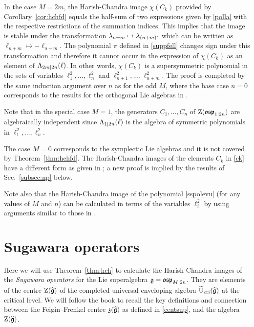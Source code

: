 \documentclass[12pt]{article}
\begin{document}
In the case $M=2m$,
the Harish-Chandra image
$\chi(C_k)$ provided by Corollary~\ref{cor:hchfd} equals
the half-sum of two expressions given by \eqref{polla} with the respective
restrictions of the summation indices. This implies that the image
is stable under the transformation $\lambda_{n+m}\mapsto \lambda_{(n+m)'}$
which can be written as $\ell_{n+m}\mapsto -\ell_{n+m}$.
The polynomial $\pi$ defined in \eqref{suppfell} changes sign under this transformation
and therefore it cannot occur in the expression of
$\chi(C_k)$ as an element of $\Lambda_{2m|2n}(\ell)$.
In other words, $\chi(C_k)$ is a supersymmetric polynomial
in the sets of variables $\ell_1^2,\dots,\ell_n^2$ and $\ell_{n+1}^2,\dots,\ell_{n+m}^2$.
The proof is completed by the same induction argument over $n$
as for the odd $M$,
where the base
case $n=0$ corresponds to the results
for the orthogonal Lie algebras in \cite[Prop.~5.4.1 and Sec.~13.4]{m:so}.
\epf

Note that in the special case $M=1$,
the generators $C_1,\dots,C_n$ of ${\rm Z}(\mathfrak{osp}_{1|2n})$
are algebraically independent since $\Lambda_{1|2n}(\ell)$
is the algebra of symmetric polynomials in $\ell^2_{1},\dots,\ell^2_{n}$.

The case $M=0$ corresponds to the symplectic Lie algebras and it is not covered
by Theorem~\ref{thm:hchfd}. The Harish-Chandra images of the elements $C_k$ in \eqref{ck}
have a different form
as given in \cite[Prop.~5.5.4]{m:so}; a new proof is implied
by the results of Sec.~\ref{subsec:np} below.

Note also that
the Harish-Chandra image of the polynomial \eqref{sspolevu}
(for any values of $M$ and $n$)
can be calculated in terms of the
variables $\ell_i^2$ by using arguments similar to those in \cite[Sec.~5.4]{m:so}.



\section{Sugawara operators}
\label{sec:so}


Here we will use Theorem~\ref{thm:hch} to calculate the
Harish-Chandra images of the
{\em Sugawara operators} for the Lie superalgebra $\mathfrak{g}=\mathfrak{osp}_{M|2n}$. They are
elements of the centre ${\rm Z}(\widehat{\mathfrak{g}})$ of the
completed universal enveloping algebra $\widetilde{{\rm U}}_{{\rm cri}}(\widehat{\mathfrak{g}})$
at the critical level. We will follow the book \cite[Sections~3.2 and 4.3]{f:lc}
to recall the key definitions and connection between the Feigin--Frenkel centre $\mathfrak{z}(\widehat{\mathfrak{g}})$
as defined in \eqref{centsup}, and the algebra ${\rm Z}(\widehat{\mathfrak{g}})$.
\end{document}
